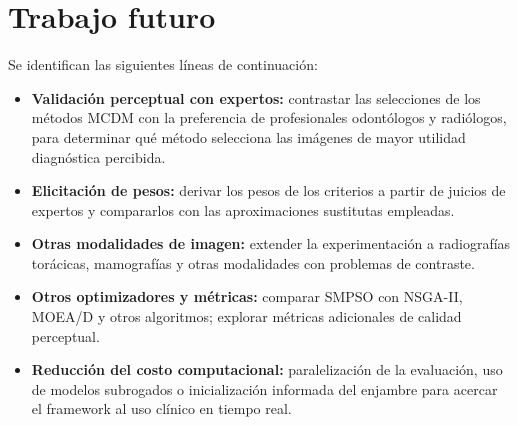 \section{Trabajo futuro}

Se identifican las siguientes líneas de continuación:

\begin{itemize}
    \item \textbf{Validación perceptual con expertos:} contrastar las selecciones de los métodos MCDM con la preferencia de profesionales odontólogos y radiólogos, para determinar qué método selecciona las imágenes de mayor utilidad diagnóstica percibida.
    \item \textbf{Elicitación de pesos:} derivar los pesos de los criterios a partir de juicios de expertos y compararlos con las aproximaciones sustitutas empleadas.
    \item \textbf{Otras modalidades de imagen:} extender la experimentación a radiografías torácicas, mamografías y otras modalidades con problemas de contraste.
    \item \textbf{Otros optimizadores y métricas:} comparar SMPSO con NSGA-II, MOEA/D y otros algoritmos; explorar métricas adicionales de calidad perceptual.
    \item \textbf{Reducción del costo computacional:} paralelización de la evaluación, uso de modelos subrogados o inicialización informada del enjambre para acercar el framework al uso clínico en tiempo real.
\end{itemize}
